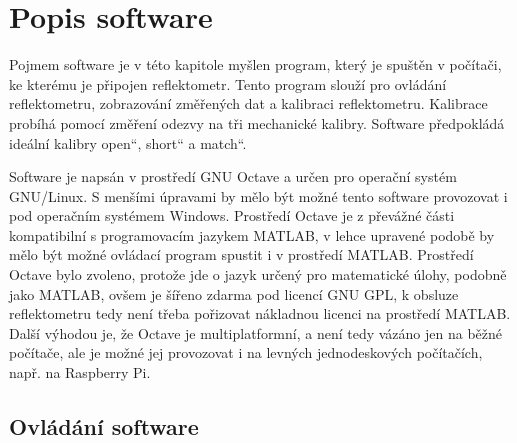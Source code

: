 \chapter{Popis software}

Pojmem software je v této kapitole myšlen program, který je spuštěn v počítači, ke kterému je připojen reflektometr. Tento program slouží pro ovládání reflektometru, zobrazování změřených dat a kalibraci reflektometru. Kalibrace probíhá pomocí změření odezvy na tři mechanické kalibry. Software předpokládá ideální kalibry \quotedblbase open\textquotedblleft, \quotedblbase short\textquotedblleft{} a \quotedblbase match\textquotedblleft{}.

Software je napsán v prostředí GNU Octave a určen pro operační systém GNU/Linux. S menšími úpravami by mělo být možné tento software provozovat i pod operačním systémem Windows. Prostředí Octave je z převážné části kompatibilní s programovacím jazykem MATLAB, v lehce upravené podobě by mělo být možné ovládací program spustit i  v prostředí MATLAB. Prostředí Octave bylo zvoleno, protože jde o jazyk určený pro matematické úlohy, podobně jako MATLAB, ovšem je šířeno zdarma pod licencí GNU GPL, k obsluze reflektometru tedy není třeba pořizovat nákladnou licenci na prostředí MATLAB. Další výhodou je, že Octave je multiplatformní, a není tedy vázáno jen na běžné počítače, ale je možné jej provozovat i na levných jednodeskových počítačích, např. na Raspberry Pi.

\section{Ovládání software}

